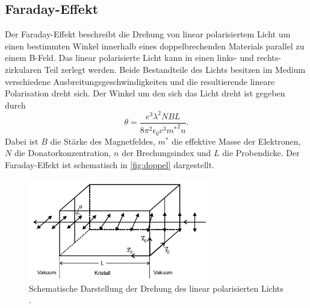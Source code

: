 \subsection{Faraday-Effekt}
\label{ssec:faraday}

Der Faraday-Effekt beschreibt die Drehung von linear polarisiertem Licht um einen bestimmten Winkel innerhalb eines doppelbrechenden Materials parallel zu einem B-Feld.
Das linear polarisierte Licht kann in einen links- und rechts-zirkularen Teil zerlegt werden. 
Beide Bestandteile des Lichts besitzen im Medium verschiedene Ausbreitungsgeschwindigkeiten und die resultierende lineare Polarisation dreht sich.
Der Winkel um den sich das Licht dreht ist gegeben durch
\begin{equation}
    \theta = \frac{e^3 \lambda^2 N B L}{8 \pi^2 \epsilon_0 c^3 {m^*}^2 n}.
    \label{eqn:theta}
\end{equation}
Dabei ist $B$ die Stärke des Magnetfeldes, $m^*$ die effektive Masse der Elektronen, $N$ die Donatorkonzentration, $n$ der Brechungsindex und $L$ die Probendicke.
Der Faraday-Effekt ist schematisch in \autoref{fig:doppel} dargestellt.
\begin{figure}
    \centering
    \includegraphics[width=0.7\textwidth]{figure/doppelbrechung.png}
    \caption{Schematische Darstellung der Drehung des linear polarisierten Lichts \cite{anleitung}.}
    \label{fig:doppel}
\end{figure}